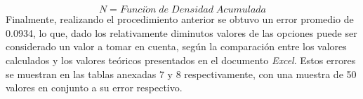    \begin{equation*}
       N = Funci\acute{o}n\;de\;Densidad\;Acumulada
   \end{equation*}
\noindent Finalmente, realizando el procedimiento anterior se obtuvo un error promedio de 0.0934, lo que, dado los relativamente diminutos valores de las opciones puede ser considerado un valor a tomar en cuenta, según la comparación entre los valores calculados y los valores teóricos presentados en el documento \textit{Excel}. Estos errores se muestran en las tablas anexadas 7 y 8 respectivamente, con una muestra de 50 valores en conjunto a su error respectivo.
\newpage

